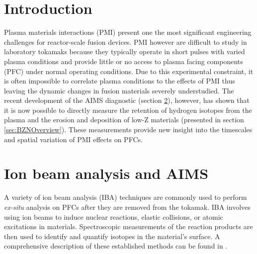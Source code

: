 \documentclass[final,3p,times,twocolumn]{elsarticle}
\begin{document}
\begin{frontmatter}
\begin{abstract}
\end{abstract}

\begin{keyword}


\end{keyword}

\end{frontmatter}


\section{Introduction}
\label{sec:Intro}
Plasma materials interactions (PMI) present one the most significant engineering challenges for reactor-scale fusion devices. PMI however are difficult to study in laboratory tokamaks because they typically operate in short pulses with varied plasma conditions and provide little or no access to plasma facing components (PFC) under normal operating conditions. Due to this experimental constraint, it is often impossible to correlate plasma conditions to the effects of PMI thus leaving the dynamic changes in fusion materials severely understudied.  The recent development of the AIMS diagnostic \cite{RSIPaper} (section \ref{sec:AIMSOverview}), however, has shown that it is now possible to directly measure the retention of hydrogen isotopes from the plasma \cite{HartwigDRetention} and the erosion and deposition of low-Z materials (presented in section \ref{sec:BZNOverview}). These measurements provide new insight into the timescales and spatial variation of PMI effects on PFCs. 


\section{Ion beam analysis and AIMS}
\label{sec:AIMSOverview}

A variety of ion beam analysis (IBA) techniques are commonly used to perform \textit{ex-situ} analysis on PFCs after they are removed from the tokamak. IBA involves using ion beams to induce nuclear reactions, elastic collisions, or atomic excitations in materials.  Spectroscopic measurements of the reaction products are then used to identify and quantify isotopes in the material's surface. A comprehensive description of these established methods  can be found in \cite{tesmer1995handbook}.
\end{document}
